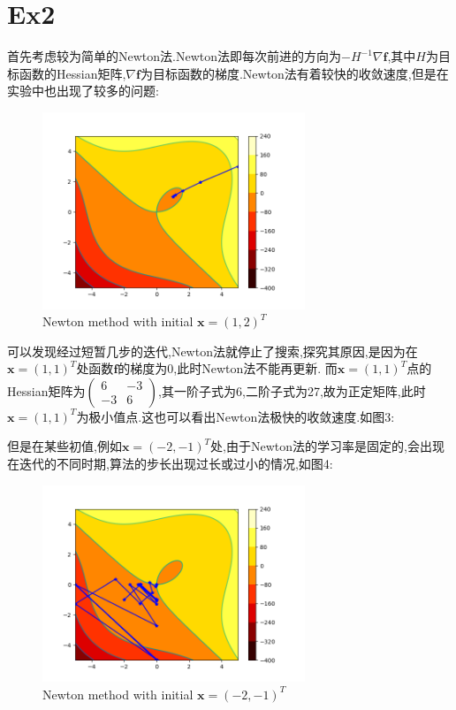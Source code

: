 \documentclass[UTF8,a4paper,11pt]{ctexart}
\begin{document}
\section{Ex2}
\par 首先考虑较为简单的Newton法.Newton法即每次前进的方向为$-H^{-1}\nabla\mathbf{f}$,其中$H$为目标函数的Hessian矩阵,$\nabla\mathbf{f}$为目标函数的梯度.Newton法有着较快的收敛速度,但是在实验中也出现了较多的问题:
\begin{figure}[htbp]
	\centering
	\includegraphics[width=0.7\textwidth,height=0.5\textwidth]{newton1.png}
	\caption{Newton method with initial $\mathbf{x}=(1,2)^{T}$}
\end{figure}
\par 可以发现经过短暂几步的迭代,Newton法就停止了搜索,探究其原因,是因为在$\mathbf{x}=(1,1)^{T}$处函数$\mathbf{f}$的梯度为0,此时Newton法不能再更新.
而$\mathbf{x}=(1,1)^{T}$点的Hessian矩阵为$\begin{pmatrix}
	6&-3\\
	-3&6
\end{pmatrix}$,其一阶子式为6,二阶子式为27,故为正定矩阵,此时$\mathbf{x}=(1,1)^{T}$为极小值点.这也可以看出Newton法极快的收敛速度.如图3:
\par 但是在某些初值,例如$\mathbf{x}=(-2,-1)^{T}$处,由于Newton法的学习率是固定的,会出现在迭代的不同时期,算法的步长出现过长或过小的情况,如图4:
\begin{figure}[htbp]
	\centering
	\includegraphics[width=0.7\textwidth,height=0.5\textwidth]{newton2.png}
	\caption{Newton method with initial $\mathbf{x}=(-2,-1)^{T}$}
\end{figure}
\end{document}
